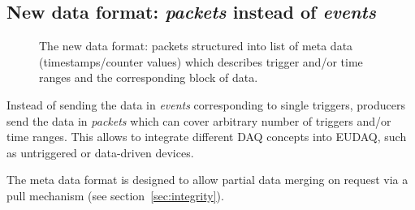 \documentclass[paper=a4, fontsize=11pt]{scrartcl}	%
\numberwithin{equation}{section}		%
\numberwithin{figure}{section}			%
\numberwithin{table}{section}				%
\begin{document}
\subsection{New data format: \emph{packets} instead of \emph{events}}
\label{sec:event}

\begin{figure}[htbp]
  \centering
  
  \caption{The new data format: packets structured into list of meta
    data (timestamps/counter values) which describes trigger and/or
    time ranges and the corresponding block of data.}
\label{fig:packetformat}
\end{figure}

Instead of sending the data in \emph{events} corresponding to single
triggers, producers send the data in \emph{packets} which can cover
arbitrary number of triggers and/or time ranges. This allows to
integrate different DAQ concepts into EUDAQ, such as untriggered or
data-driven devices.

The meta data format is designed to allow partial data merging on
request via a pull mechanism (see section~\ref{sec:integrity}).
\end{document}
